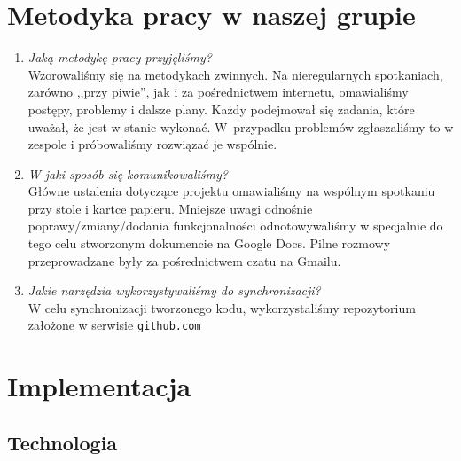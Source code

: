 \documentclass[pdflatex,11pt]{aghdpl}
\begin{document}

\chapter{Metodyka pracy w naszej grupie}

\begin{enumerate}
\item \textit{Jaką metodykę pracy przyjęliśmy?}\\
Wzorowaliśmy się na metodykach zwinnych. Na nieregularnych spotkaniach, zarówno ,,przy piwie'', jak i za pośrednictwem internetu, omawialiśmy postępy, problemy i dalsze plany. Każdy podejmował się zadania, które uważał, że jest w stanie wykonać. W~przypadku problemów zgłaszaliśmy to w zespole i próbowaliśmy rozwiązać je wspólnie.

\item \textit{W jaki sposób się komunikowaliśmy?}\\
Główne ustalenia dotyczące projektu omawialiśmy na wspólnym spotkaniu przy stole i kartce papieru. Mniejsze uwagi odnośnie poprawy/zmiany/dodania funkcjonalności odnotowywaliśmy w specjalnie do tego celu stworzonym dokumencie na Google Docs. Pilne rozmowy przeprowadzane były za pośrednictwem czatu na Gmailu.

\item \textit{Jakie narzędzia wykorzystywaliśmy do synchronizacji?}\\
W celu synchronizacji tworzonego kodu, wykorzystaliśmy repozytorium założone w serwisie \texttt{github.com}

\end{enumerate}



\chapter{Implementacja}

\section{Technologia}
\end{document}
